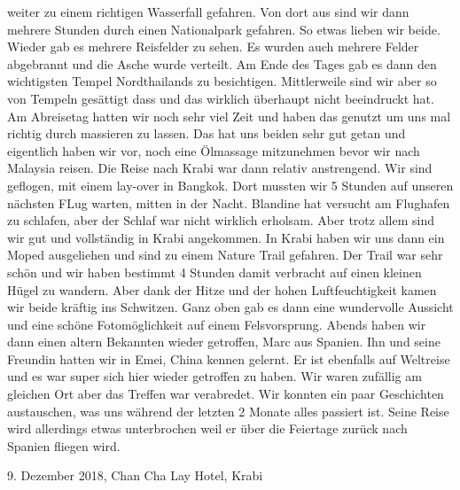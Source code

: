 \documentclass[11pt]{book}
\begin{document}
weiter zu einem richtigen Wasserfall gefahren. Von dort aus sind wir dann mehrere Stunden durch einen Nationalpark gefahren. So etwas
lieben wir beide. Wieder gab es mehrere Reisfelder zu sehen. Es wurden auch mehrere Felder abgebrannt und die Asche wurde verteilt. 
Am Ende des Tages gab es dann den wichtigsten Tempel Nordthailands zu besichtigen. Mittlerweile sind wir aber so von Tempeln gesättigt
dass und das wirklich überhaupt nicht beeindruckt hat. Am Abreisetag hatten wir noch sehr viel Zeit und haben das genutzt um uns mal 
richtig durch massieren zu lassen. Das hat uns beiden sehr gut getan und eigentlich haben wir vor, noch eine Ölmassage mitzunehmen 
bevor wir nach Malaysia reisen. 
Die Reise nach Krabi war dann relativ anstrengend. Wir sind geflogen, mit einem lay-over in Bangkok. Dort mussten wir 5 Stunden 
auf unseren nächsten FLug warten, mitten in der Nacht. Blandine hat versucht am Flughafen zu schlafen, aber der Schlaf war nicht 
wirklich erholsam. Aber trotz allem sind wir gut und vollständig in Krabi angekommen. In Krabi haben wir uns dann ein Moped ausgeliehen 
und sind zu einem Nature Trail gefahren. Der Trail war sehr schön und wir haben bestimmt 4 Stunden damit verbracht auf einen kleinen 
Hügel zu wandern. Aber dank der Hitze und der hohen Luftfeuchtigkeit kamen wir beide kräftig ins Schwitzen. Ganz oben gab es dann 
eine wundervolle Aussicht und eine schöne Fotomöglichkeit auf einem Felsvorsprung. Abends haben wir dann einen altern Bekannten wieder 
getroffen, Marc aus Spanien. Ihn und seine Freundin hatten wir in Emei, China kennen gelernt. Er ist ebenfalls auf Weltreise und es 
war super sich hier wieder getroffen zu haben. Wir waren zufällig am gleichen Ort aber das Treffen war verabredet. Wir konnten 
ein paar Geschichten austauschen, was uns während der letzten 2 Monate alles passiert ist. Seine Reise wird allerdings etwas unterbrochen 
weil er über die Feiertage zurück nach Spanien fliegen wird.

9. Dezember 2018, Chan Cha Lay Hotel, Krabi
\end{document}
